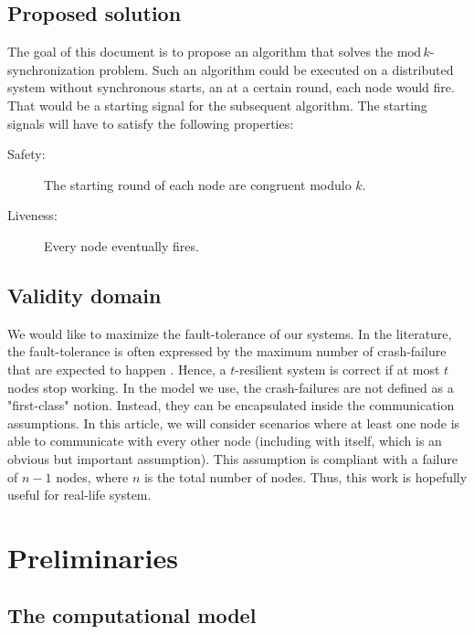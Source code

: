 \documentclass{article}
\begin{document}
\subsection{Proposed solution}

The goal of this document is to propose an algorithm that solves the $\mathrm{mod}\,k$-synchronization problem.
Such an algorithm could be executed on a distributed system without synchronous starts,
an at a certain round, each node would fire.
That would be a starting signal for the subsequent algorithm.
The starting signals will have to satisfy the following properties:
\begin{description}
	\item[Safety:] The starting round of each node are congruent modulo $k$.
	\item[Liveness:] Every node eventually fires.
\end{description}

\subsection{Validity domain}

We would like to maximize the fault-tolerance of our systems.
In the literature, the fault-tolerance is often expressed by the maximum number of crash-failure that are expected to happen \cite{gafni}.
Hence, a $t$-resilient system is correct if at most $t$ nodes stop working.
In the model \cite{model_ho} we use, the crash-failures are not defined as a "first-class" notion.
Instead, they can be encapsulated inside the communication assumptions.
In this article, we will consider scenarios where at least one node is able to communicate with every other node (including with itself, which is an obvious but important assumption).
This assumption is compliant with a failure of $n-1$ nodes, where $n$ is the total number of nodes.
Thus, this work is hopefully useful for real-life system.

\section{ Preliminaries}\label{sec:model}
 
\subsection{The computational model}
	
\end{document}
